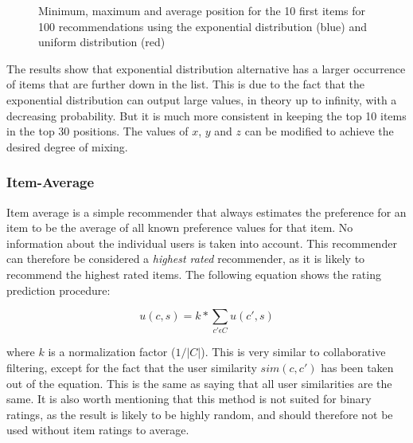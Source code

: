 \begin{figure}[H]
	\label{fig:minmaxuniform}
	\centering   
	\caption{Minimum, maximum and average position for the 10 first items for 100 recommendations using the exponential distribution (blue) and uniform distribution (red)}

\end{figure}

The results show that exponential distribution alternative has a larger occurrence of items that are further down in the list. This is due to the fact that the exponential distribution can output large values, in theory up to infinity, with a decreasing probability. But it is much more consistent in keeping the top 10 items in the top 30 positions. The values of $x$, $y$ and $z$ can be modified to achieve the desired degree of mixing.

\subsubsection{Item-Average}

Item average is a simple recommender that always estimates the preference for an item to be the average of all known preference values for that item. No information about the individual users is taken into account. This recommender can therefore be considered a \emph{highest rated} recommender, as it is likely to recommend the highest rated items. The following equation shows the rating prediction procedure:

\begin{equation}
\label{equation:itemaverageratingprediction}
u(c,s) = k * \sum_{c' \epsilon C} u(c',s)
\end{equation}

where $k$ is a normalization factor ($1/|C|$). This is very similar to collaborative filtering, except for the fact that the user similarity $sim(c, c')$ has been taken out of the equation. This is the same as saying that all user similarities are the same. It is also worth mentioning that this method is not suited for binary ratings, as the result is likely to be highly random, and should therefore not be used without item ratings to average.

